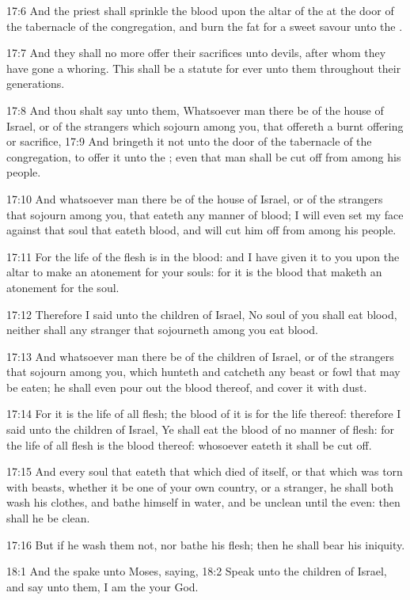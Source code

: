 17:6 And the priest shall sprinkle the blood upon the altar of the
\LORD at the door of the tabernacle of the congregation, and burn the
fat for a sweet savour unto the \LORD.

17:7 And they shall no more offer their sacrifices unto devils, after
whom they have gone a whoring. This shall be a statute for ever unto
them throughout their generations.

17:8 And thou shalt say unto them, Whatsoever man there be of the
house of Israel, or of the strangers which sojourn among you, that
offereth a burnt offering or sacrifice, 17:9 And bringeth it not unto
the door of the tabernacle of the congregation, to offer it unto the
\LORD; even that man shall be cut off from among his people.

17:10 And whatsoever man there be of the house of Israel, or of the
strangers that sojourn among you, that eateth any manner of blood; I
will even set my face against that soul that eateth blood, and will
cut him off from among his people.

17:11 For the life of the flesh is in the blood: and I have given it
to you upon the altar to make an atonement for your souls: for it is
the blood that maketh an atonement for the soul.

17:12 Therefore I said unto the children of Israel, No soul of you
shall eat blood, neither shall any stranger that sojourneth among you
eat blood.

17:13 And whatsoever man there be of the children of Israel, or of the
strangers that sojourn among you, which hunteth and catcheth any beast
or fowl that may be eaten; he shall even pour out the blood thereof,
and cover it with dust.

17:14 For it is the life of all flesh; the blood of it is for the life
thereof: therefore I said unto the children of Israel, Ye shall eat
the blood of no manner of flesh: for the life of all flesh is the
blood thereof: whosoever eateth it shall be cut off.

17:15 And every soul that eateth that which died of itself, or that
which was torn with beasts, whether it be one of your own country, or
a stranger, he shall both wash his clothes, and bathe himself in
water, and be unclean until the even: then shall he be clean.

17:16 But if he wash them not, nor bathe his flesh; then he shall bear
his iniquity.

18:1 And the \LORD spake unto Moses, saying, 18:2 Speak unto the
children of Israel, and say unto them, I am the \LORD your God.

